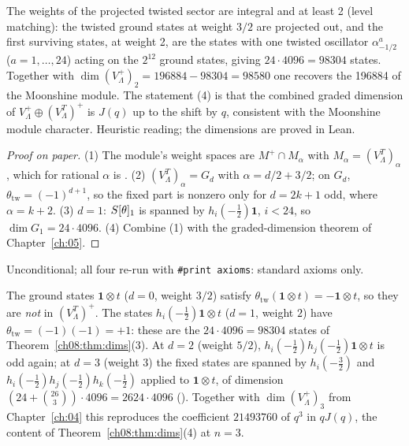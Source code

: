 \begin{physics}
The weights of the projected twisted sector are integral and at least 2 (level matching): the twisted ground states at weight $3/2$ are projected out, and the first surviving states, at weight 2, are the states with one twisted oscillator $\alpha_{-1/2}^a$ ($a=1,\dots,24$) acting on the $2^{12}$ ground states, giving $24\cdot4096=98304$ states. Together with $\dim(V_\Lambda^+)_2=196884-98304=98580$ one recovers the 196884 of the Moonshine module. The statement (4) is that the combined graded dimension of $V_\Lambda^+\oplus(V_\Lambda^T)^+$ is $J(q)$ up to the shift by $q$, consistent with the Moonshine module character. Heuristic reading; the dimensions are proved in Lean.
\end{physics}
\begin{proof}[Proof on paper]
(1) The module's weight spaces are $M^+\cap M_\alpha$ with $M_\alpha=(V_\Lambda^T)_\alpha$, which for
rational $\alpha$ is .  (2) $(V_\Lambda^T)_\alpha=G_d$ with $\alpha=d/2+3/2$; on $G_d$,
$\theta_{\mathrm{tw}}=(-1)^{d+1}$, so the fixed part is nonzero only for $d=2k+1$ odd, where
$\alpha=k+2$.  (3) $d=1$: $S[\theta]_1$ is spanned by $h_i(-\frac12)\mathbf 1$, $i<24$, so
$\dim G_1=24\cdot4096$.  (4) Combine (1) with the graded-dimension theorem of Chapter~\ref{ch:05}.
\end{proof}
\begin{status}
Unconditional; all four re-run with \texttt{\#print axioms}: standard axioms only.
\end{status}

\begin{example}\label{ch08:ex:lowest}
The ground states $\mathbf 1\otimes t$ ($d=0$, weight $3/2$) satisfy
$\theta_{\mathrm{tw}}(\mathbf 1\otimes t)=-\mathbf 1\otimes t$, so they are \emph{not} in
$(V_\Lambda^T)^+$.  The states $h_i(-\frac12)\mathbf 1\otimes t$ ($d=1$, weight $2$) have
$\theta_{\mathrm{tw}}=(-1)(-1)=+1$: these are the $24\cdot4096=98304$ states of
Theorem~\ref{ch08:thm:dims}(3).  At $d=2$ (weight $5/2$), $h_i(-\frac12)h_j(-\frac12)\mathbf 1\otimes t$
is odd again; at $d=3$ (weight $3$) the fixed states are spanned by $h_i(-\frac32)$ and
$h_i(-\frac12)h_j(-\frac12)h_k(-\frac12)$ applied to $\mathbf 1\otimes t$, of dimension
$(24+\binom{26}{3})\cdot4096=2624\cdot4096$ ().  Together with
$\dim(V_\Lambda^+)_3$ from Chapter~\ref{ch:04} this reproduces the coefficient $21493760$ of $q^3$ in
$qJ(q)$, the content of Theorem~\ref{ch08:thm:dims}(4) at $n=3$.
\end{example}

